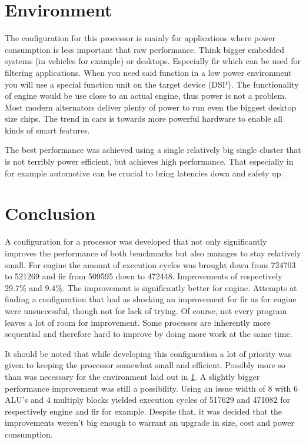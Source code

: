 \section{Environment}
\label{ch:environment}
The configuration for this processor is mainly for applications where power consumption is less important that raw performance.
Think bigger embedded systems (in vehicles for example) or desktops.
Especially fir which can be used for filtering applications.
When you need said function in a low power environment you will use a special function unit on the target device (DSP).
The functionality of engine would be use close to an actual engine, thus power is not a problem.
Most modern alternators deliver plenty of power to run even the biggest desktop size chips.
The trend in cars is towards more powerful hardware to enable all kinds of smart features.

The best performance was achieved using a single relatively big single cluster that is not terribly power efficient, but achieves high performance.
That especially in for example automotive can be crucial to bring latencies down and safety up.

\section{Conclusion}
A configuration for a processor was developed that not only significantly improves the performance of both benchmarks but also manages to stay relatively small. For engine the amount of execution cycles was brought down from 724703 to 521269 and fir from 509595 down to 472448. Improvements of respectively 29.7\% and 9.4\%. The improvement is significantly better for engine. Attempts at finding a configuration that had as shocking an improvement for fir as for engine were unsuccessful, though not for lack of trying. Of course, not every program leaves a lot of room for improvement. Some processes are inherently more sequential and therefore hard to improve by doing more work at the same time.

It should be noted that while developing this configuration a lot of priority was given to keeping the processor somewhat small and efficient. Possibly more so than was necessary for the environment laid out in \cref{ch:environment}. A slightly bigger performance improvement was still a possibility. Using an issue width of 8 with 6 ALU's and 4 multiply blocks yielded execution cycles of 517629 and 471082 for respectively engine and fir for example. Despite that, it was decided that the improvements weren't big enough to warrant an upgrade in size, cost and power consumption.

